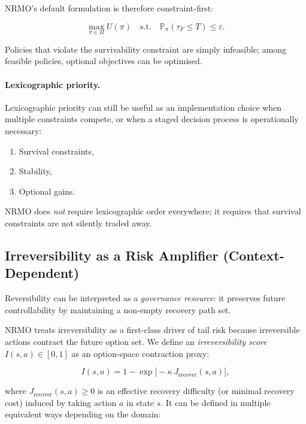 \noindent
NRMO's default formulation is therefore constraint-first:

\begin{equation}
\max_{\pi \in \Pi} U(\pi)
\quad \text{s.t.} \quad
\mathbb{P}_\pi(\tau_F \le T) \le \varepsilon.
\end{equation}

Policies that violate the survivability constraint are simply
infeasible; among feasible policies, optional objectives can be
optimised.

\paragraph{Lexicographic priority.}
Lexicographic priority can still be useful as an implementation
choice when multiple constraints compete, or when a staged decision
process is operationally necessary:

\begin{enumerate}
\item Survival constraints,
\item Stability,
\item Optional gains.
\end{enumerate}

\noindent
NRMO does \emph{not} require lexicographic order everywhere; it
requires that survival constraints are not silently traded away.

\subsection{Irreversibility as a Risk Amplifier (Context-Dependent)}
\label{sec:foundations-3-3-irreversibility}

Reversibility can be interpreted as a \emph{governance resource}: it
preserves future controllability by maintaining a non-empty recovery
path set.

NRMO treats irreversibility as a first-class driver of tail risk
because irreversible actions contract the future option set. We
define an \emph{irreversibility score} $I(s, a) \in [0, 1]$ as an
option-space contraction proxy:

\begin{equation}
I(s, a) = 1 - \exp\bigl[-\kappa \, J_{\mathrm{recover}}(s, a)\bigr],
\label{eq:foundations-irreversibility-score}
\end{equation}

where $J_{\mathrm{recover}}(s, a) \ge 0$ is an effective recovery
difficulty (or minimal recovery cost) induced by taking action $a$
in state $s$. It can be defined in multiple equivalent ways
depending on the domain:

